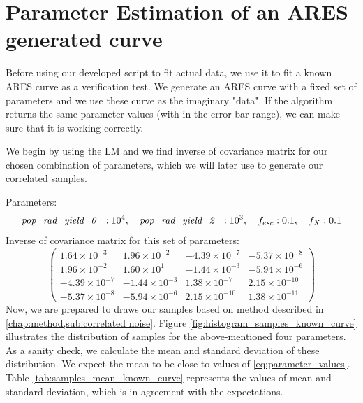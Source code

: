 \documentclass[12pt, TexShade, letterpaper]{report}
\begin{document}
\section{Parameter Estimation of an ARES generated curve}
\label{chap:results,sub:known_curve}
Before using our developed script to fit actual data, we use it to fit a known ARES curve as a verification test. We generate an ARES curve with a fixed set of parameters and we use these curve as the imaginary "data". If the algorithm returns the same parameter values (with in the error-bar range), we can make sure that it is working correctly.\par
We begin by using the LM and we find inverse of covariance matrix for our chosen combination of parameters, which we will later use to generate our correlated samples.\par
Parameters:
\begin{equation}
\emph{pop\_rad\_yield\_0\_}: 10^4, \quad \emph{pop\_rad\_yield\_2\_}: 10^3,\quad f_{esc}: 0.1,\quad f_X: 0.1 
\label{eq:parameter_values}
\end{equation}
Inverse of covariance matrix for this set of parameters:
\begin{equation}
\label{eq:cov_mat_known_curve}
    \begin{pmatrix}
    1.64\times 10^{-3} & 1.96 \times 10^{-2} &  -4.39 \times 10^{-7} &  -5.37 \times 10^{-8} \\
    1.96 \times 10^{-2} &  1.60 \times 10^{1} &  -1.44 \times 10^{-3} &  -5.94 \times 10^{-6} \\
    -4.39 \times 10^{-7} &  -1.44 \times 10^{-3} &  1.38 \times 10^{-7} &  2.15 \times 10^{-10} \\
    -5.37 \times 10^{-8} &  -5.94 \times 10^{-6} &  2.15 \times 10^{-10} &  1.38 \times 10^{-11} 
    \end{pmatrix}
\end{equation}
Now, we are prepared to draws our samples based on method described in \ref{chap:method,sub:correlated noise}. Figure \ref{fig:histogram_samples_known_curve} illustrates the distribution of samples for the above-mentioned four parameters. As a sanity check, we calculate the mean and standard deviation of these distribution. We expect the mean to be close to values of \ref{eq:parameter_values}. Table \ref{tab:samples_mean_known_curve} represents the values of mean and standard deviation, which is in agreement with the expectations.\par
\end{document}
